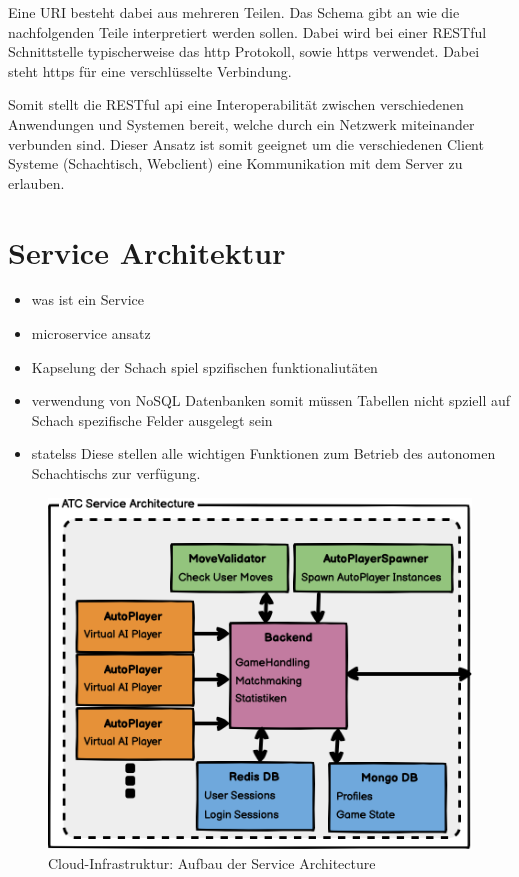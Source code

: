 Eine URI besteht dabei aus mehreren Teilen. Das Schema gibt an wie die
nachfolgenden Teile interpretiert werden sollen. Dabei wird bei einer
RESTful Schnittstelle typischerweise das \gls{http} Protokoll, sowie
\gls{https} verwendet. Dabei steht \gls{https} für eine verschlüsselte
Verbindung.

Somit stellt die RESTful \gls{api} eine Interoperabilität zwischen
verschiedenen Anwendungen und Systemen bereit, welche durch ein Netzwerk
miteinander verbunden sind. Dieser Ansatz ist somit geeignet um die
verschiedenen Client Systeme (Schachtisch, Webclient) eine Kommunikation
mit dem Server zu erlauben.

\hypertarget{service-architektur}{%
\section{Service Architektur}\label{service-architektur}}

\begin{itemize}
\tightlist
\item
  was ist ein Service
\item
  microservice ansatz
\item
  Kapselung der Schach spiel spzifischen funktionaliutäten
\item
  verwendung von NoSQL Datenbanken somit müssen Tabellen nicht spziell
  auf Schach spezifische Felder ausgelegt sein
\item
  statelss Diese stellen alle wichtigen Funktionen zum Betrieb des
  autonomen Schachtischs zur verfügung.
\end{itemize}

\begin{figure}
\centering
\includegraphics{images/ATC_Service_Architecture.png}
\caption{Cloud-Infrastruktur: Aufbau der Service Architecture
\label{ATC_Service_Architecture}}
\end{figure}

